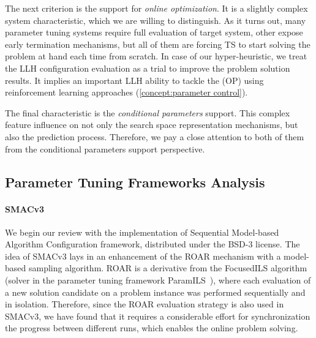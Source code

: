 The next criterion is the support for \emph{online optimization}. It is a slightly complex system characteristic, which we are willing to distinguish. As it turns out, many parameter tuning systems require full evaluation of target system, other expose early termination mechanisms, but all of them are forcing TS to start solving the problem at hand each time from scratch. In case of our hyper-heuristic, we treat the LLH configuration evaluation as a trial to improve the problem solution results. It implies an important LLH ability to tackle the (OP) using reinforcement learning approaches (\cref{concept:parameter control}).

The final characteristic is the \emph{conditional parameters} support. This complex feature influence on not only the search space representation mechanisms, but also the prediction process. Therefore, we pay a close attention to both of them from the conditional parameters support perspective.

\subsection{Parameter Tuning Frameworks Analysis}\label{impl: Parameter Tuning Frameworks Analysis}
\paragraph{SMACv3}
We begin our review with the implementation of Sequential Model-based Algorithm Configuration framework, distributed under the BSD-3 license. The idea of SMACv3 lays in an enhancement of the ROAR mechanism with a model-based sampling algorithm. ROAR is a derivative from the FocusedILS algorithm (solver in the parameter tuning framework ParamILS~\cite{hutter2009paramils}), where each evaluation of a new solution candidate on a problem instance was performed sequentially and in isolation. Therefore, since the ROAR evaluation strategy is also used in SMACv3, we have found that it requires a considerable effort for synchronization the progress between different runs, which enables the online problem solving.

